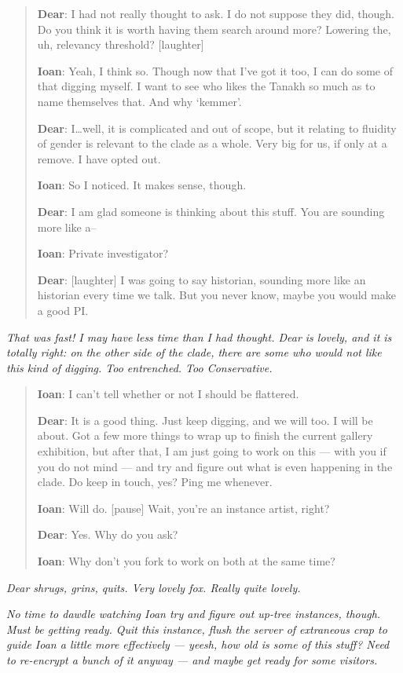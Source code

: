 \begin{quote}
\textbf{Dear}: I had not really thought to ask. I do not suppose they did, though. Do you think it is worth having them search around more? Lowering the, uh, relevancy threshold? {[}laughter{]}

\textbf{Ioan}: Yeah, I think so. Though now that I've got it too, I can do some of that digging myself. I want to see who likes the Tanakh so much as to name themselves that. And why `kemmer'.

\textbf{Dear}: I\ldots{}well, it is complicated and out of scope, but it relating to fluidity of gender is relevant to the clade as a whole. Very big for us, if only at a remove. I have opted out.

\textbf{Ioan}: So I noticed. It makes sense, though.

\textbf{Dear}: I am glad someone is thinking about this stuff. You are sounding more like a--

\textbf{Ioan}: Private investigator?

\textbf{Dear}: {[}laughter{]} I was going to say historian, sounding more like an historian every time we talk. But you never know, maybe you would make a good PI.
\end{quote}

\emph{That was fast! I may have less time than I had thought. Dear is lovely, and it is totally right: on the other side of the clade, there are some who would not like this kind of digging. Too entrenched. Too Conservative.}

\begin{quote}
\textbf{Ioan}: I can't tell whether or not I should be flattered.

\textbf{Dear}: It is a good thing. Just keep digging, and we will too. I will be about. Got a few more things to wrap up to finish the current gallery exhibition, but after that, I am just going to work on this — with you if you do not mind — and try and figure out what is even happening in the clade. Do keep in touch, yes? Ping me whenever.

\textbf{Ioan}: Will do. {[}pause{]} Wait, you're an instance artist, right?

\textbf{Dear}: Yes. Why do you ask?

\textbf{Ioan}: Why don't you fork to work on both at the same time?
\end{quote}

\emph{Dear shrugs, grins, quits. Very lovely fox. Really quite lovely.}

\emph{No time to dawdle watching Ioan try and figure out up-tree instances, though. Must be getting ready. Quit this instance, flush the server of extraneous crap to guide Ioan a little more effectively — yeesh, how old is some of this stuff? Need to re-encrypt a bunch of it anyway — and maybe get ready for some visitors.}
